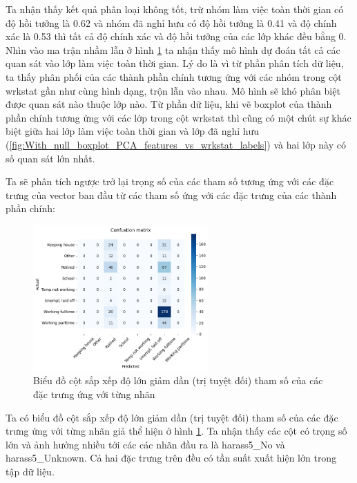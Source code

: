 \begin{enumerate}[label=(\alph*)]
    Ta nhận thấy kết quả phân loại không tốt, trừ nhóm làm việc toàn thời gian có độ hồi tưởng là 0.62 và nhóm đã nghỉ hưu có độ hồi tưởng là 0.41 và độ chính xác là 0.53 thì tất cả độ chính xác và độ hồi tưởng của các lớp khác đều bằng 0.
    Nhìn vào ma trận nhầm lẫn ở hình \ref{fig:With_null_models_confusion_matrix_Random_Forest_PCA_features} ta nhận thấy mô hình dự đoán tất cả các quan sát vào lớp làm việc toàn thời gian.
    Lý do là vì từ phần phân tích dữ liệu, ta thấy phân phối của các thành phần chính tương ứng với các nhóm trong cột wrkstat gần như cùng hình dạng, trộn lẫn vào nhau.
    Mô hình sẽ khó phân biệt được quan sát nào thuộc lớp nào.
    Từ phần dữ liệu, khi vẽ boxplot của thành phần chính tương ứng với các lớp trong cột wrkstat thì cũng có một chút sự khác biệt giữa hai lớp làm việc toàn thời gian và lớp đã nghỉ hưu (\ref{fig:With_null_boxplot_PCA_features_vs_wrkstat_labels}) và hai lớp này có số quan sát lớn nhất.

    Ta sẽ phân tích ngược trở lại trọng số của các tham số tương ứng với các đặc trưng của vector ban đầu từ các tham số ứng với các đặc trưng của các thành phần chính:

    \begin{figure}[H]
        \centering
        \includegraphics[width=0.6\textwidth]{figures/Thanh/Models/Random_Forest/With_null_models_confusion_matrix_Random_Forest_PCA_features.png}
        \caption{Biểu đồ cột sắp xếp độ lớn giảm dần (trị tuyệt đối) tham số của các đặc trưng ứng với từng nhãn}
        \label{fig:With_null_models_confusion_matrix_Random_Forest_PCA_features}
    \end{figure}

    Ta có biểu đồ cột sắp xếp độ lớn giảm dần (trị tuyệt đối) tham số của các đặc trưng ứng với từng nhãn giả thể hiện ở hình \ref{fig:With_null_models_confusion_matrix_Random_Forest_PCA_features}.
    Ta nhận thấy các cột có trọng số lớn và ảnh hưởng nhiều tới các các nhãn đầu ra là harass5\_No và harass5\_Unknown.
    Cả hai đặc trưng trên đều có tần suất xuất hiện lớn trong tập dữ liệu.


\end{enumerate}
